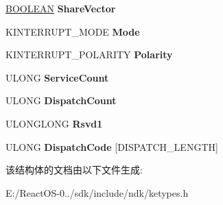 \begin{DoxyCompactItemize}
\hyperlink{_processor_bind_8h_a112e3146cb38b6ee95e64d85842e380a}{B\+O\+O\+L\+E\+AN} {\bfseries Share\+Vector}
\item 
\mbox{\label{struct___k_i_n_t_e_r_r_u_p_t_a5d3cb01d88b4dd0ab1efbef085e63aaa}} 
K\+I\+N\+T\+E\+R\+R\+U\+P\+T\+\_\+\+M\+O\+DE {\bfseries Mode}
\item 
\mbox{\label{struct___k_i_n_t_e_r_r_u_p_t_a4e0e4e7755b72027eba0569007a01f63}} 
K\+I\+N\+T\+E\+R\+R\+U\+P\+T\+\_\+\+P\+O\+L\+A\+R\+I\+TY {\bfseries Polarity}
\item 
\mbox{\label{struct___k_i_n_t_e_r_r_u_p_t_a37bddfddf4ab5e1e7a74b9130de9e9a6}} 
U\+L\+O\+NG {\bfseries Service\+Count}
\item 
\mbox{\label{struct___k_i_n_t_e_r_r_u_p_t_a3d247a48a157a330d6ab21ca376dd53c}} 
U\+L\+O\+NG {\bfseries Dispatch\+Count}
\item 
\mbox{\label{struct___k_i_n_t_e_r_r_u_p_t_ab775cefb2d338625c8a01d50291223dc}} 
U\+L\+O\+N\+G\+L\+O\+NG {\bfseries Rsvd1}
\item 
\mbox{\label{struct___k_i_n_t_e_r_r_u_p_t_a4805fc2c0a7b910d77d6a0f9de9cc27e}} 
U\+L\+O\+NG {\bfseries Dispatch\+Code} \mbox{[}D\+I\+S\+P\+A\+T\+C\+H\+\_\+\+L\+E\+N\+G\+TH\mbox{]}
\end{DoxyCompactItemize}


该结构体的文档由以下文件生成\+:\begin{DoxyCompactItemize}
\item 
E\+:/\+React\+O\+S-\/0../sdk/include/ndk/ketypes.\+h\end{DoxyCompactItemize}
